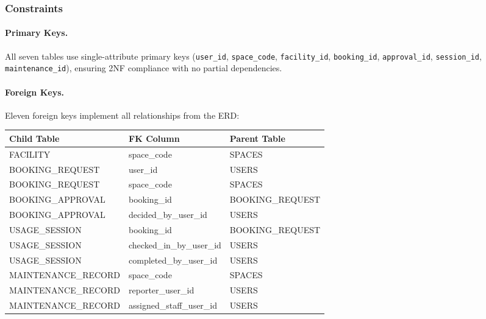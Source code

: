 \subsubsection{Constraints}

\paragraph{Primary Keys.}
All seven tables use single-attribute primary keys (\texttt{user\_id}, \texttt{space\_code}, \texttt{facility\_id}, \texttt{booking\_id}, \texttt{approval\_id}, \texttt{session\_id}, \texttt{maintenance\_id}), ensuring 2NF compliance with no partial dependencies.

\paragraph{Foreign Keys.}
Eleven foreign keys implement all relationships from the ERD:

\begin{table}[H]
	\centering
	\begin{tabularx}{\textwidth}{|l|l|X|}
		\hline
		\textbf{Child Table} & \textbf{FK Column}        & \textbf{Parent Table} \\
		\hline
		FACILITY             & space\_code               & SPACES                \\
		\hline
		BOOKING\_REQUEST     & user\_id                  & USERS                 \\
		\hline
		BOOKING\_REQUEST     & space\_code               & SPACES                \\
		\hline
		BOOKING\_APPROVAL    & booking\_id               & BOOKING\_REQUEST      \\
		\hline
		BOOKING\_APPROVAL    & decided\_by\_user\_id     & USERS                 \\
		\hline
		USAGE\_SESSION       & booking\_id               & BOOKING\_REQUEST      \\
		\hline
		USAGE\_SESSION       & checked\_in\_by\_user\_id & USERS                 \\
		\hline
		USAGE\_SESSION       & completed\_by\_user\_id   & USERS                 \\
		\hline
		MAINTENANCE\_RECORD  & space\_code               & SPACES                \\
		\hline
		MAINTENANCE\_RECORD  & reporter\_user\_id        & USERS                 \\
		\hline
		MAINTENANCE\_RECORD  & assigned\_staff\_user\_id & USERS                 \\
		\hline
	\end{tabularx}
\end{table}

